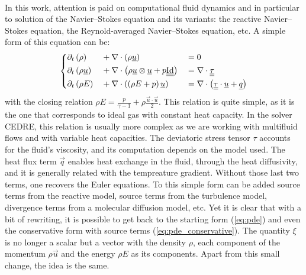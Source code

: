     \paragraph{}
    In this work, attention is paid on computational fluid dynamics and in particular to solution of the Navier--Stokes equation and its variants: the reactive Navier--Stokes equation, the Reynold-averaged Navier--Stokes equation, etc.
    A simple form of this equation can be:
    \begin{equation}\label{eq:ns}
      \left\{\begin{aligned}
        &\partial_t\left(\rho         \right) &&+ \nabla\cdot\left( \rho \underline{u} \right) &&= 0 \\
        &\partial_t\left(\rho \underline{u} \right) &&+ \nabla\cdot\left( \rho \underline{u} \otimes \underline{u} + p \underline{\underline{\operatorname{Id}}} \right) &&= \nabla\cdot \underline{\underline{\tau}}\\
        &\partial_t\left( \rho E      \right) &&+ \nabla\cdot\left( \left(\rho E + p\right) \underline{u} \right) &&=
          \nabla\cdot\left( \underline{\underline{\tau}} \cdot \underline{u} + \underline{q}\right)
      \end{aligned}\right.
    \end{equation}
    with the closing relation $\rho E = \frac{p}{\gamma - 1} + \rho\frac{\vec{u} \cdot \vec{u}}{2}$.
    This relation is quite simple, as it is the one that corresponds to ideal gas with constant heat capacity.
    In the solver CEDRE, this relation is usually more complex as we are working with multifluid flows and with variable heat capacities.
    The deviatoric stress tensor $\tau$ accounts for the fluid's viscosity, and its computation depends on the model used.
    The heat flux term $\vec{q}$ enables heat exchange in the fluid, through the heat diffusivity, and it is generally related with the tempreature gradient.
    Without those last two terms, one recovers the Euler equations.
    To this simple form can be added source terms from the reactive model, source terms from the turbulence model, divergence terms from a molecular diffusion model, etc.
    Yet it is clear that with a bit of rewriting, it is possible to get back to the starting form (\ref{eq:pde}) and even the conservative form with source terms (\ref{eq:pde_conservative}).
    The quantity $\xi$ is no longer a scalar but a vector with the density $\rho$, each component of the momentum $\rho\vec{u}$ and the energy $\rho E$ as its components.
    Apart from this small change, the idea is the same.

